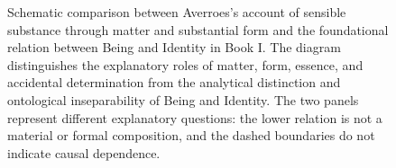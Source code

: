 \begin{figure}[htbp]
\begin{tikzpicture}
\end{tikzpicture}

\caption[
    Averroes's account of substance and the Book I relation
    between Being and Identity
]{
    Schematic comparison between Averroes's account of
    sensible substance through matter and substantial form
    and the foundational relation between Being and Identity
    in Book I. The diagram distinguishes the explanatory
    roles of matter, form, essence, and accidental determination
    from the analytical distinction and ontological inseparability
    of Being and Identity. The two panels represent different
    explanatory questions: the lower relation is not a material
    or formal composition, and the dashed boundaries do not
    indicate causal dependence.
}

\label{fig:VS.B01.P01.C08.S15.SS17.P004.DG01}

\end{figure}

